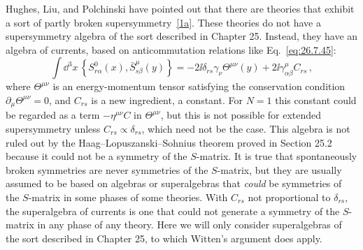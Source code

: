 Hughes, Liu, and Polchinski have pointed out that there are theories that
exhibit a sort of partly broken
supersymmetry~\hyperref[ch29-ref-1a]{[1a]}. These theories do not have a
supersymmetry algebra of the sort described in Chapter 25. Instead, they
have an algebra of currents, based on anticommutation relations like
Eq.~\eqref{eq:26.7.45}:
\[
  \int \dd^3x\,
  \left\{S^0_{r\alpha}(x),\bar S^\mu_{s\beta}(y)\right\}
  =
  -2\ii\delta_{rs}\gamma_\nu\Theta^{\mu\nu}(y)
  +2\ii\gamma^\mu_{\alpha\beta}C_{rs}\,,
\]
where \(\Theta^{\mu\nu}\) is an energy-momentum tensor satisfying the
conservation condition \(\partial_\mu\Theta^{\mu\nu}=0\), and \(C_{rs}\)
is a new ingredient, a constant. For \(N=1\) this constant could be
regarded as a term \(-\eta^{\mu\nu}C\) in \(\Theta^{\mu\nu}\), but this is
not possible for extended supersymmetry unless
\(C_{rs}\propto\delta_{rs}\), which need not be the case. This algebra is
not ruled out by the Haag--Lopuszanski--Sohnius theorem proved in
Section 25.2 because it could not be a symmetry of the \(S\)-matrix. It is
true that spontaneously broken symmetries are never symmetries of the
\(S\)-matrix, but they are usually assumed to be based on algebras or
superalgebras that \emph{could} be symmetries of the \(S\)-matrix in some
phases of some theories. With \(C_{rs}\) not proportional to
\(\delta_{rs}\), the superalgebra of currents is one that could not
generate a symmetry of the \(S\)-matrix in any phase of any theory. Here
we will only consider superalgebras of the sort described in Chapter 25,
to which Witten's argument does apply.


